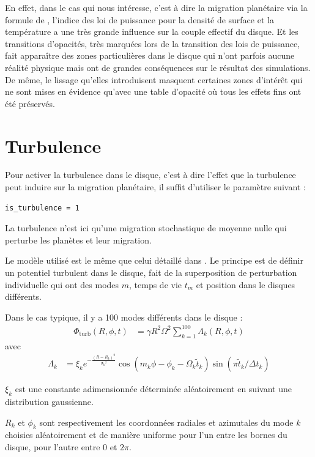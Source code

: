 En effet, dans le cas qui nous intéresse, c'est à dire la migration planétaire via la formule de \citep{paardekooper2011torque}, l'indice des loi de puissance pour la densité de surface et la température a une très grande influence sur la couple effectif du disque. Et les transitions d'opacités, très marquées lors de la transition des lois de puissance, fait apparaître des zones particulières dans le disque qui n'ont parfois aucune réalité physique mais ont de grandes conséquences sur le résultat des simulations. De même, le lissage qu'elles introduisent masquent certaines zones d'intérêt qui ne sont mises en évidence qu'avec une table d'opacité où tous les effets fins ont été préservés.

\section{Turbulence}
Pour activer la turbulence dans le disque, c'est à dire l'effet que la turbulence peut induire sur la migration planétaire, il suffit d'utiliser le paramètre suivant : 
\begin{verbatim}
is_turbulence = 1
\end{verbatim}

La turbulence n'est ici qu'une migration stochastique de moyenne nulle qui perturbe les planètes et leur migration. 

Le modèle utilisé est le même que celui détaillé dans \cite{ogihara2007accretion}. Le principe est de définir un potentiel turbulent dans le disque, fait de la superposition de perturbation individuelle qui ont des modes $m$, temps de vie $t_m$ et position dans le disques différents. 

Dans le cas typique, il y a 100 modes différents dans le disque : 
\begin{align}
\Phi_\text{turb}(R,\phi,t) &= \gamma R^2 \Omega^2 \sum_{k=1}^{100} \Lambda_k(R,\phi,t)
\end{align}
avec 
\begin{align}
\Lambda_k &= \xi_k e^{-\frac{(R-R_k)^2}{{\sigma_k}^2}} \cos\left(m_k \phi -\phi_k - \Omega_k\tilde{t}_k\right) \sin\left(\pi \tilde{t}_k/\Delta t_k\right)
\end{align}

$\xi_k$ est une constante adimensionnée déterminée aléatoirement en suivant une distribution gaussienne.

$R_k$ et $\phi_k$ sont respectivement les coordonnées radiales et azimutales du mode $k$ choisies aléatoirement et de manière uniforme pour l'un entre les bornes du disque, pour l'autre entre $0$ et $2\pi$. 

